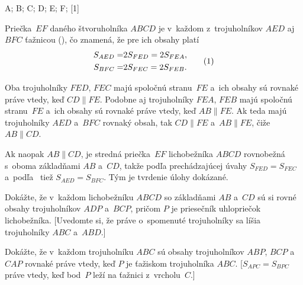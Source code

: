 {%
\fontplace
\tpoint A; \tpoint B; \bpoint C; \bpoint D;
\lBpoint E; \rBpoint F;
[1] \hfil\Obr

Priečka~$EF$ daného štvoruholníka $ABCD$ je v~každom z~trojuholníkov $AED$
aj $BFC$ ťažnicou (\obr), čo znamená, že pre ich obsahy platí
$$
\aligned
S_{AED}=&2S_{FED}=2S_{FEA},\\
S_{BFC}=&2S_{FEC}=2S_{FEB}.
\endaligned                  \tag1
$$

\inspicture{}

Oba trojuholníky $FED$, $FEC$ majú spoločnú stranu~$FE$ a~ich obsahy
sú rovnaké práve vtedy, keď $CD\parallel FE$. Podobne aj trojuholníky $FEA$,
$FEB$ majú spoločnú stranu~$FE$ a~ich obsahy sú rovnaké
práve vtedy, keď $AB\parallel FE$. Ak teda majú trojuholníky $AED$ a~$BFC$
rovnaký obsah, tak $CD\parallel FE$ a~$AB\parallel FE$, čiže
$AB\parallel CD$.

Ak naopak $AB\parallel CD$, je stredná priečka~$EF$
lichobežníka $ABCD$ rovnobežná s~oboma základňami $AB$ a~$CD$,
takže podľa prechádzajúcej úvahy $S_{FED}=S_{FEC}$ a~podľa~ tiež
$S_{AED}=S_{BFC}$. Tým je tvrdenie úlohy dokázané.


Dokážte, že v~každom lichobežníku $ABCD$ so základňami
$AB$ a~$CD$ sú si rovné obsahy trojuholníkov $ADP$ a~$BCP$, pričom
$P$ je priesečník uhlopriečok lichobežníka. [Uvedomte si, že práve
o~spomenuté trojuholníky sa líšia trojuholníky $ABC$ a~$ABD$.]

Dokážte, že v~každom trojuholníku $ABC$ sú obsahy trojuholníkov
$ABP$, $BCP$ a~$CAP$ rovnaké práve vtedy, keď $P$ je ťažiskom
trojuholníka $ABC$. [$S_{APC}=S_{BPC}$ práve vtedy, keď bod~$P$ leží na
ťažnici z~vrcholu~$C$.]
}

